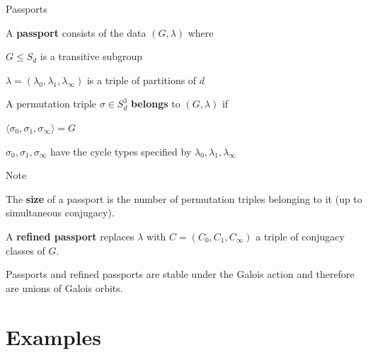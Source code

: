 \documentclass{beamer}
\begin{document}
\begin{frame}[plain]{Passports}

A \textbf{passport} consists of the data $(G,\lambda)$ where
\begin{vfilleditems}
\item
$G \leq S_d$ is a transitive subgroup
\item
$\lambda=(\lambda_0,\lambda_1,\lambda_\infty)$ is a triple of partitions of $d$
\end{vfilleditems}
A permutation triple $\sigma \in S_d^3$ \textbf{belongs} to $(G, \lambda)$ if
\begin{vfilleditems}
\item
$\langle \sigma_0, \sigma_1, \sigma_\infty \rangle = G$
\item
$\sigma_0, \sigma_1, \sigma_\infty$ have the cycle types specified by $\lambda_0, \lambda_1, \lambda_\infty$
\end{vfilleditems}
Note
\begin{vfilleditems}
\item The \textbf{size} of a passport is the number of permutation triples belonging to it (up to simultaneous conjugacy).

\item A \textbf{refined passport} replaces $\lambda$ with $C=(C_0,C_1,C_\infty)$
a triple of conjugacy classes of $G$.

\item Passports and refined passports are stable under the Galois action and therefore are
unions of Galois orbits.
\end{vfilleditems}

\end{frame}

\section{Examples}
\end{document}
